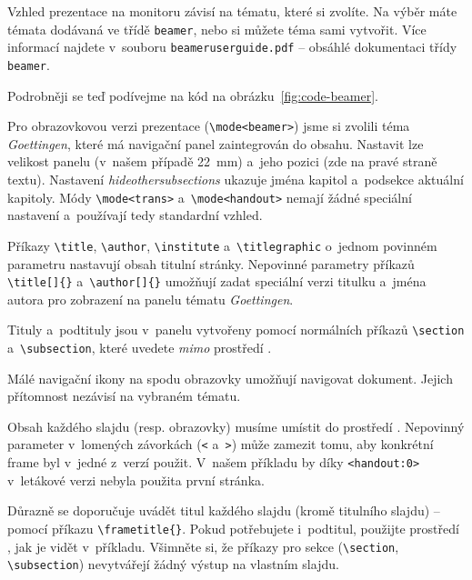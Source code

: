 Vzhled prezentace na monitoru závisí na tématu, které si zvolíte. Na výběr
máte témata dodávaná ve třídě \verb+beamer+, nebo si můžete téma sami vytvořit.
Více informací najdete v~souboru \texttt{beameruserguide.pdf} -- obsáhlé dokumentaci
třídy \verb+beamer+.

Podrobněji se teď podívejme na kód na obrázku~\ref{fig:code-beamer}.

Pro obrazovkovou verzi prezentace (\verb|\mode<beamer>|) jsme si zvolili
téma \emph{Goettingen}, které má navigační panel zaintegrován
do obsahu. Nastavit lze velikost panelu (v~našem případě 22~mm) a~jeho
pozici (zde na pravé straně textu). Nastavení \emph{hideothersubsections}
ukazuje jména kapitol a~podsekce aktuální kapitoly. Módy \verb|\mode<trans>|
a~\verb|\mode<handout>| nemají žádné speciální nastavení a~používají
tedy standardní vzhled.

Příkazy \verb|\title|, \verb|\author|, \verb|\institute|
a~\verb|\titlegraphic| o~jednom povinném parametru nastavují obsah titulní stránky.
Nepovinné parametry příkazů \verb|\title[]{}| a~\verb|\author[]{}|
umožňují zadat speciální verzi titulku a~jména autora pro
zobrazení na panelu tématu \emph{Goettingen}.

Tituly a~podtituly jsou v~panelu vytvořeny pomocí normálních příkazů
\verb|\section| a~\verb|\subsection|, které uvedete
\emph{mimo} prostředí .

Málé navigační ikony na spodu obrazovky umožňují navigovat dokument.
Jejich přítomnost nezávisí na vybraném tématu.

Obsah každého slajdu (resp. obrazovky) musíme umístit
do prostředí . Nepovinný parameter v~lomených
závorkách (\verb|<| a~\verb|>|) může zamezit tomu, aby konkrétní
frame byl v~jedné z~verzí použit. V~našem příkladu by
díky \verb|<handout:0>| v~letákové verzi nebyla použita první stránka.

Důrazně se doporučuje uvádět titul každého slajdu (kromě titulního
slajdu) -- pomocí příkazu \verb|\frametitle{}|. Pokud potřebujete
i~podtitul, použijte prostředí , jak je vidět v~příkladu.
Všimněte si, že příkazy pro sekce (\verb|\section|, \verb|\subsection|)
nevytvářejí žádný výstup na vlastním slajdu.

